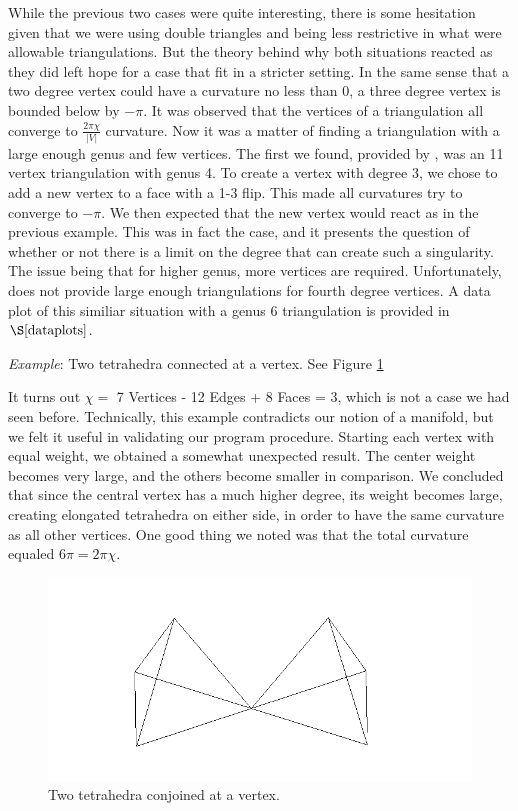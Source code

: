 \documentclass[12pt]{article}
\begin{document}
\noindent While the previous two cases were quite interesting, there is some hesitation given that we were using double triangles and being less restrictive in what were allowable triangulations. But the theory behind why both situations reacted as they did left hope for a case that fit in a stricter setting. In the same sense that a two degree vertex could have a curvature no less than 0, a three degree vertex is bounded below by $-\pi$. It was observed that the vertices of a triangulation all converge to $\displaystyle\frac{2\pi\chi}{|V|}$ curvature. Now it was a matter of finding a triangulation with a large enough genus and few vertices. The first we found, provided by \cite{lutzmanifold}, was an 11 vertex triangulation with genus 4. To create a vertex with degree 3, we chose to add a new vertex to a face with a 1-3 flip. This made all curvatures try to converge to $-\pi$. We then expected that the new vertex would react as in the previous example. This was in fact the case, and it presents the question of whether or not there is a limit on the degree that can create such a singularity. The issue being that for higher genus, more vertices are required. Unfortunately, \cite{lutzmanifold} does not provide large enough triangulations for fourth degree vertices. A data plot of this similiar situation with a genus 6 triangulation is provided in $\S\ref{dataplots}$. \newline

\noindent \textit{Example}: Two tetrahedra connected at a vertex. See Figure \ref{fig:tt}\newline

\noindent It turns out $\chi = $ 7 Vertices - 12 Edges + 8 Faces = 3, which is not a case we had seen before. Technically, this example contradicts our notion of a manifold, but we felt it useful in validating our program procedure. Starting each vertex with equal weight, we obtained a somewhat unexpected result. The center weight becomes very large, and the others become smaller in comparison. We concluded that since the central vertex has a much higher degree, its weight becomes large, creating elongated tetrahedra on either side, in order to have the same curvature as all other vertices. One good thing we noted was that the total curvature equaled $6\pi = 2\pi\chi$. 

\begin{figure}
\includegraphics{Pictures/tetratouch.png}
\caption{Two tetrahedra conjoined at a vertex.}
\label{fig:tt}
\end{figure}
\end{document}
